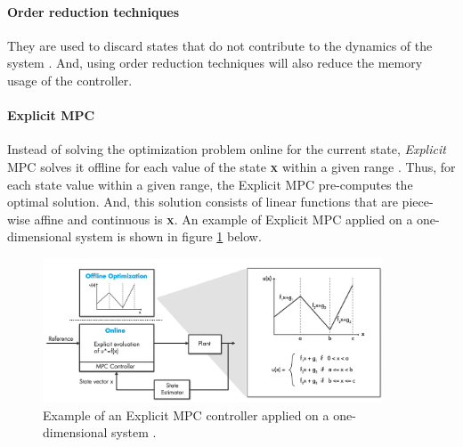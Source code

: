 \documentclass{thesisreport}
\begin{document}
\paragraph{Order reduction techniques} They are used to discard states that do not contribute to the dynamics of the system \cite{4421358}. And, using order reduction techniques will also reduce the memory usage of the controller.

\paragraph{Explicit MPC} Instead of solving the optimization problem online for the current state, \textit{Explicit} MPC solves it offline for each value of the state \textbf{\textsc{x}} within a given range \cite{Bemporad2013}. Thus, for each state value within a given range, the Explicit MPC pre-computes the optimal solution. And, this solution consists of linear functions that are piece-wise affine and continuous is \textbf{\textsc{x}}. An example of Explicit MPC applied on a one-dimensional system is shown in figure \ref{Explicit_MPC_1D} below.

\begin{figure}[h]
\centering
\includegraphics[width=0.9\textwidth]{Images/Control/Explicit_MPC_a}
\caption{Example of an Explicit MPC controller applied on a one-dimensional system \cite{MathWorks2018_new}.}
\label{Explicit_MPC_1D}
\end{figure}
\end{document}
